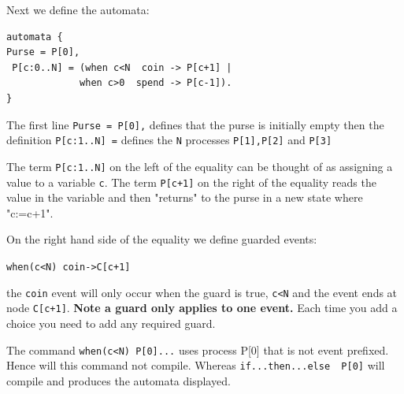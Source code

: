 \documentclass[]{article}
\begin{document}
Next  we define the automata:

\begin{center}\begin{minipage}{0.5\textwidth}
\begin{verbatim}
automata {
Purse = P[0],
 P[c:0..N] = (when c<N  coin -> P[c+1] |
             when c>0  spend -> P[c-1]).
}\end{verbatim}
\end{minipage}\end{center}

The first line \verb|Purse = P[0],| defines that the purse is initially empty then  the definition \verb$P[c:1..N] =$    defines the \verb$N$ processes \verb$P[1],P[2]$ and \verb$P[3]$


The term \verb$P[c:1..N]$ on the left of the equality can be thought of  as assigning a value to a variable \verb$c$. The term \verb$P[c+1]$  on the right of the equality reads the value in the variable and then  "returns" to the purse in a new state where "c:=c+1".

On the right hand side of the equality we define guarded events:
\begin{center}\verb$when(c<N) coin->C[c+1]$ \end{center}
the \verb$coin$ event  will only occur when the guard is true, \verb|c<N| and the event  ends at node \verb$C[c+1]$.  {\bf Note a guard  only applies to one event.}  Each time you add a choice you need to add any required  guard.


The command {\color{red} \verb|when(c<N) P[0]...| }  uses process {\sf P[0]} that is not event prefixed. Hence will this command not compile.
Whereas  \verb|if...then...else  P[0]| will compile and produces the automata displayed.
\end{document}
